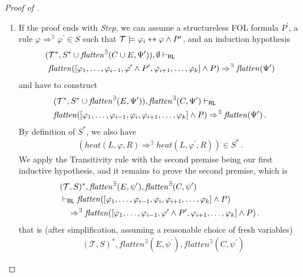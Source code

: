 \begin{proof}[Proof of ]
\begin{enumerate}
    \item If the proof ends with \emph{Step},
      we can assume a structureless FOL formula $P^\prime$, a rule $\varphi \Rightarrow^\exists \varphi^\prime \in S$ such that
      $\mathcal{T} \models \varphi_i \leftrightarrow \varphi \land P^\prime$,
      and an induction hypothesis
      \begin{align*}
        (&\mathcal{T}^*, S^* \cup \mathit{flatten}^\exists(C \cup E, \Psi^\prime)), \emptyset \vdash_{\mathsf{RL}}
          \\ &
          \mathit{flatten}([\varphi_1, \ldots, \varphi_{i-1}, \varphi^\prime \land P^\prime, \varphi_{i+1}, \ldots, \varphi_k] \land P) \Rightarrow^\exists \mathit{flatten}(\Psi^\prime)     
      \end{align*}
      and have to construct
      \begin{align*}
      & (\mathcal{T}^*, S^* \cup \mathit{flatten}^\exists(E, \Psi^\prime)), \mathit{flatten}^\exists(C, \Psi^\prime) \vdash_{\mathsf{RL}} \\
          & \mathit{flatten}([\varphi_1, \ldots, \varphi_{i-1}, \varphi_i, \varphi_{i+1}, \ldots, \varphi_k] \land P) \Rightarrow^\exists \mathit{flatten}(\Psi^\prime)    \, .
      \end{align*}
        By definition of $S^*$, we also have
        \begin{align*}
            (\mathit{heat}(L, \varphi, R) \Rightarrow^\exists \mathit{heat}(L, \varphi^\prime, R)) \in S^* \, .
        \end{align*}
    We apply the Transitivity rule with the second premise being our first inductive hypothesis, and it remains to prove the second premise, which is
    \begin{align*}
        & (\mathcal{T}, S)^*, \mathit{flatten}^\exists(E, \psi^\prime), \mathit{flatten}^\exists(C, \psi^\prime)
        \\& \vdash_{\mathsf{RL}}
        \mathit{flatten}([\varphi_1, \ldots, \varphi_{i-1}, \varphi_i, \varphi_{i+1}, \ldots, \varphi_k] \land P)
        \\&\quad \Rightarrow^\exists
        \mathit{flatten}([\varphi_1, \ldots, \varphi_{i-1}, \varphi^\prime \land P^\prime, \varphi_{i+1}, \ldots, \varphi_k] \land P) \, .
    \end{align*}
    that is (after simplification, assuming a reasonable choice of fresh variables)
    \begin{align*}
        & (\mathcal{T}, S)^*, \mathit{flatten}^\exists(E, \psi^\prime), \mathit{flatten}^\exists(C, \psi^\prime)

\end{align*}
\end{enumerate}
\end{proof}

